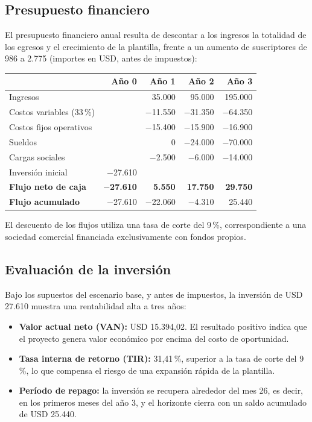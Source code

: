 \subsection{Presupuesto financiero}
El presupuesto financiero anual resulta de descontar a los ingresos la totalidad de los egresos y el crecimiento de la plantilla, frente a un aumento de suscriptores de 986 a 2.775 (importes en USD, antes de impuestos):

\begin{center}
\small
\begin{tabularx}{\textwidth}{|X|r|r|r|r|}
\hline
 & \textbf{Año 0} & \textbf{Año 1} & \textbf{Año 2} & \textbf{Año 3}\\ \hline
Ingresos & & 35.000 & 95.000 & 195.000\\ \hline
Costos variables (33\,\%) & & $-$11.550 & $-$31.350 & $-$64.350\\ \hline
Costos fijos operativos & & $-$15.400 & $-$15.900 & $-$16.900\\ \hline
Sueldos & & 0 & $-$24.000 & $-$70.000\\ \hline
Cargas sociales & & $-$2.500 & $-$6.000 & $-$14.000\\ \hline
Inversión inicial & $-$27.610 & & & \\ \hline
\textbf{Flujo neto de caja} & \textbf{$-$27.610} & \textbf{5.550} & \textbf{17.750} & \textbf{29.750}\\ \hline
\textbf{Flujo acumulado} & $-$27.610 & $-$22.060 & $-$4.310 & 25.440\\ \hline
\end{tabularx}
\end{center}

El descuento de los flujos utiliza una tasa de corte del 9\,\%, correspondiente a una sociedad comercial financiada exclusivamente con fondos propios.

\subsection{Evaluación de la inversión}
Bajo los supuestos del escenario base, y antes de impuestos, la inversión de USD 27.610 muestra una rentabilidad alta a tres años:
\begin{itemize}
  \item \textbf{Valor actual neto (VAN):} USD 15.394,02. El resultado positivo indica que el proyecto genera valor económico por encima del costo de oportunidad.
  \item \textbf{Tasa interna de retorno (TIR):} 31,41\,\%, superior a la tasa de corte del 9\,\%, lo que compensa el riesgo de una expansión rápida de la plantilla.
  \item \textbf{Período de repago:} la inversión se recupera alrededor del mes 26, es decir, en los primeros meses del año 3, y el horizonte cierra con un saldo acumulado de USD 25.440.
\end{itemize}

